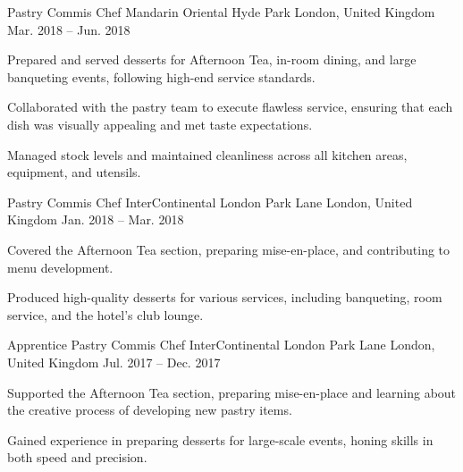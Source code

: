 \begin{cventries}
  \cventry
    {Pastry Commis Chef} %
    {Mandarin Oriental Hyde Park} %
    {London, United Kingdom} %
    {Mar. 2018 -- Jun. 2018} %
    {
      \begin{cvitems} %
        \item {Prepared and served desserts for Afternoon Tea, in-room dining, and large banqueting events, following high-end service standards.}
        \item {Collaborated with the pastry team to execute flawless service, ensuring that each dish was visually appealing and met taste expectations.}
        \vfill\null
        \columnbreak
        \item {Managed stock levels and maintained cleanliness across all kitchen areas, equipment, and utensils.}
      \end{cvitems}
    }

  \cventry
    {Pastry Commis Chef} %
    {InterContinental London Park Lane} %
    {London, United Kingdom} %
    {Jan. 2018 -- Mar. 2018} %
    {
      \begin{cvitems} %
        \item {Covered the Afternoon Tea section, preparing mise-en-place, and contributing to menu development.}
        \item {Produced high-quality desserts for various services, including banqueting, room service, and the hotel's club lounge.}
      \end{cvitems}
    }

  \cventry
    {Apprentice Pastry Commis Chef} %
    {InterContinental London Park Lane} %
    {London, United Kingdom} %
    {Jul. 2017 -- Dec. 2017} %
    {
      \begin{cvitems} %
        \item {Supported the Afternoon Tea section, preparing mise-en-place and learning about the creative process of developing new pastry items.}
        \item {Gained experience in preparing desserts for large-scale events, honing skills in both speed and precision.}
      \end{cvitems}
    }


\end{cventries}
